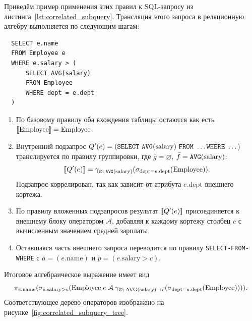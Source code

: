 \documentclass[fontsize=14pt, russian]{scrartcl}
\begin{document}
Приведём пример применения этих правил к SQL-запросу из
листинга~\ref{lst:correlated_subquery}. Трансляция этого запроса в реляционную
алгебру выполняется по следующим шагам:

\begin{listing}[H]
  \caption{Запрос с коррелированным подзапросом.}
  \label{lst:correlated_subquery}
  \begin{verbatim}
  SELECT e.name
  FROM Employee e
  WHERE e.salary > (
      SELECT AVG(salary)
      FROM Employee
      WHERE dept = e.dept
  )
  \end{verbatim}
\end{listing}

\begin{enumerate}
  \item По базовому правилу оба вхождения таблицы остаются как есть
        \([\![ \text{Employee} ]\!] = \text{Employee}\).
  \item Внутренний подзапрос
        \(Q'(e) = (\SELECT\ \AVG(\text{salary})\ \FROM\ \ldots \WHERE\ \ldots\))
        транслируется по правилу группировки, где \(\bar{g} = \varnothing\),
        \(\bar{f} = \texttt{AVG}(\text{salary})\):
        \[
          [\![ Q'(e) ]\!] = \gamma_{\varnothing;\,\texttt{AVG}(\text{salary})}(\sigma_{\text{dept} = e.\text{dept}}(\text{Employee})).
        \]
        Подзапрос коррелирован, так как зависит от атрибута \(e.\text{dept}\)
        внешнего кортежа.
  \item По правилу вложенных подзапросов результат \([\![ Q'(e) ]\!]\) присоединяется
        к внешнему блоку оператором \(\mathcal{A}\), добавляя к каждому кортежу
        столбец \(c\) с вычисленным значением средней зарплаты.
  \item Оставшаяся часть внешнего запроса переводится по правилу
        \texttt{SELECT-FROM-WHERE} с \(\bar{a} = (e.\text{name})\) и
        \(p = (e.\text{salary} > c)\).
\end{enumerate}

Итоговое алгебраическое выражение имеет вид
\[
  \pi_{e.\text{name}}(\sigma_{e.\text{salary} > c}(\text{Employee}\;e \mathbin{\mathcal{A}} \gamma_{\varnothing;\,\text{AVG}(\text{salary}) \to c}(\sigma_{\text{dept} = e.\text{dept}}(\text{Employee})))).
\]
Соответствующее дерево операторов изображено на
рисунке~\ref{fig:correlated_subquery_tree}.
\end{document}
